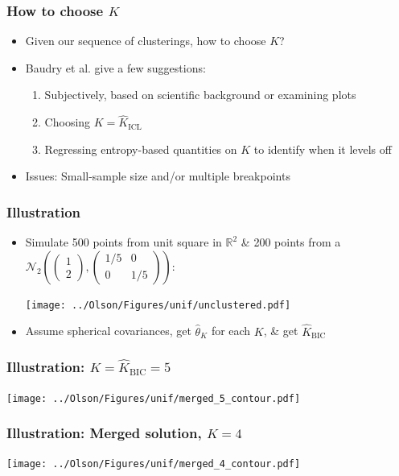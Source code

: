 \documentclass[mathserif,compress]{beamer}
\newcommand*\reals{\mathbb{R}}
\newcommand*\estim[1]{\widehat{#1}}
\renewcommand\;{\,}
\begin{document}
\begin{frame}\frametitle{How to choose $K$}
\begin{itemize}
\item[]
Given our sequence of clusterings, how to choose $K$?
\bigskip
\item[]
Baudry et al. give a few suggestions:
\begin{enumerate}
\medskip
\item
Subjectively, based on scientific background or examining plots
\bigskip
\item
Choosing $K = \estim K_\text{ICL}$
\medskip
\item
Regressing entropy-based quantities on $K$ to identify when it levels off
\end{enumerate}
\bigskip
\item[]
Issues: Small-sample size and/or multiple breakpoints
\end{itemize}
\end{frame}

\begin{frame}\frametitle{Illustration}
\begin{itemize}
\item[]
Simulate 500 points from unit square in $\reals^2$ \& 200 points from a 
$\mathcal N_2\left(\begin{pmatrix} 1 \\ 2 \end{pmatrix},
	\begin{pmatrix} 1/5 & 0 \\ 0 & 1/5 \end{pmatrix}\right)$:
\begin{center}
\texttt{[image: ../Olson/Figures/unif/unclustered.pdf]}
\end{center}
\item[]
Assume spherical covariances, get $\estim\theta_K$  for each $K$, \& get $\estim K_\text{BIC}$
\end{itemize}
\end{frame}

\begin{frame}\frametitle{Illustration: $K = \estim K_\text{BIC} = 5$}
\begin{center}
\texttt{[image: ../Olson/Figures/unif/merged\_5\_contour.pdf]}
\end{center}
\end{frame}

\begin{frame}\frametitle{Illustration: Merged solution, $K = 4$}
\begin{center}
\texttt{[image: ../Olson/Figures/unif/merged\_4\_contour.pdf]}
\end{center}
\end{frame}
\end{document}
